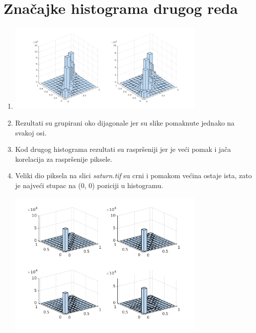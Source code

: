 \documentclass[12pt, a4]{report}
\begin{document}
\section{Značajke histograma drugog reda}
\begin{enumerate}
    \item
        \begin{minipage}{\linewidth}
            \centering
            \includegraphics[width=0.75\textwidth]{hist2}
        \end{minipage}
    \item
        Rezultati su grupirani oko dijagonale jer su slike pomaknute jednako na svakoj osi.
    \item
        Kod drugog histograma rezultati su raspršeniji jer je veći pomak i jača korelacija za raspršenije piksele.
    \item
        Veliki dio piksela na slici {\it saturn.tif} su crni i pomakom većina ostaje ista, zato je najveći stupac na (0, 0) poziciji u histogramu.


        \begin{minipage}{\linewidth}
            \centering
            \includegraphics[width=0.75\textwidth]{saturnhist}
        \end{minipage}


\end{enumerate}
\end{document}
